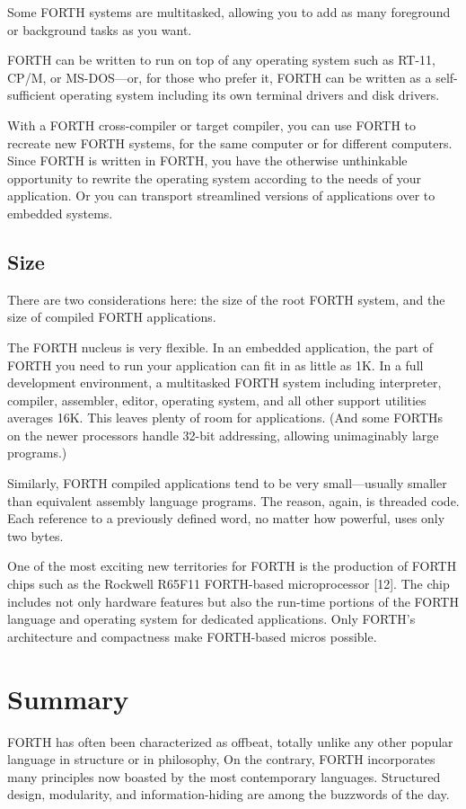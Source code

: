 Some FORTH systems are multitasked, allowing you to add as many foreground
or background tasks as you want.

FORTH can be written to run on top of any operating system such as
RT-11, CP/M, or MS-DOS---or, for those who prefer it, FORTH can be
written as a self-sufficient operating system including its own terminal
drivers and disk drivers.

With a FORTH cross-compiler or target compiler, you can use FORTH
to recreate new FORTH systems, for the same computer or for different
computers. Since FORTH is written in FORTH, you have the otherwise
unthinkable opportunity to rewrite the operating system according
to the needs of your application. Or you can transport streamlined
versions of applications over to embedded systems. 


\subsection{Size}
There are two considerations here: the size of the root FORTH system,
and the size of compiled FORTH applications.

The FORTH nucleus is very flexible. In an embedded application, the
part of FORTH you need to run your application can fit in as little
as 1K. In a full development environment, a multitasked FORTH system
including interpreter, compiler, assembler, editor, operating system,
and all other support utilities averages 16K. This leaves plenty of
room for applications. (And some FORTHs on the newer processors handle
32-bit addressing, allowing unimaginably large programs.)

Similarly, FORTH compiled applications tend to be very small---usually
smaller than equivalent assembly language programs. The reason, again,
is threaded code. Each reference to a previously defined word, no
matter how powerful, uses only two bytes.

One of the most exciting new territories for FORTH is the production
of FORTH chips such as the Rockwell R65F11 FORTH-based microprocessor
{[}12{]}. The chip includes not only hardware features but also the
run-time portions of the FORTH language and operating system for dedicated
applications. Only FORTH's architecture and compactness make FORTH-based
micros possible.


\section{Summary}
FORTH has often been characterized as offbeat, totally unlike any
other popular language in structure or in philosophy, On the contrary,
FORTH incorporates many principles now boasted by the most contemporary
languages. Structured design, modularity, and information-hiding are
among the buzzwords of the day.

